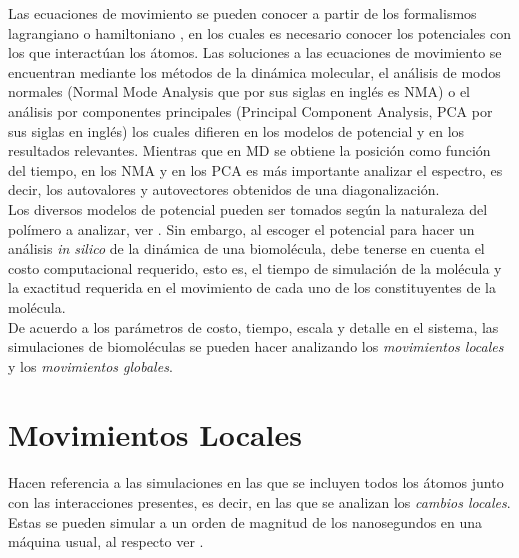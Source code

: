Las ecuaciones de movimiento se pueden conocer a partir de los formalismos lagrangiano o hamiltoniano \cite{Goldstein2001}, en los cuales es necesario conocer los potenciales con los que interact\'{u}an los \'{a}tomos. Las soluciones a las ecuaciones de movimiento se encuentran mediante los m\'{e}todos de la din\'{a}mica molecular, el an\'{a}lisis de modos normales (Normal Mode Analysis que por sus siglas en ingl\'{e}s es NMA) o el an\'{a}lisis por componentes principales (Principal Component Analysis, PCA por sus siglas en ingl\'{e}s) los cuales difieren en los modelos de potencial y en los resultados relevantes. Mientras que en MD se obtiene la posici\'{o}n como funci\'{o}n del tiempo, en los NMA y en los PCA  es m\'{a}s importante analizar el espectro, es decir, los autovalores y autovectores obtenidos de una diagonalizaci\'{o}n.\\

Los diversos modelos de potencial pueden ser tomados seg\'{u}n la naturaleza del pol\'{i}mero a analizar, ver \cite{Lezon2009}. Sin embargo, al escoger el potencial  para hacer un an\'{a}lisis \textit{in silico} de la din\'{a}mica de una biomol\'{e}cula, debe tenerse en cuenta el costo computacional requerido, esto es, el tiempo de simulaci\'{o}n de la mol\'{e}cula y la exactitud requerida en el movimiento de cada uno de los constituyentes de la mol\'{e}cula.\\

De acuerdo a los par\'{a}metros de costo, tiempo, escala y detalle en el sistema, las simulaciones de biomol\'{e}culas se pueden hacer analizando los \textit{movimientos locales} y los \textit{movimientos globales}.
\section{Movimientos Locales}
Hacen referencia a las simulaciones en las que se incluyen todos los \'{a}tomos junto con las interacciones presentes, es decir, en las que se analizan los \textit{cambios locales}. Estas se pueden simular a un orden de magnitud de los nanosegundos en una m\'{a}quina usual, al respecto ver \cite{Gur2013}.
